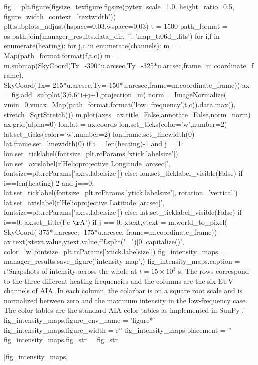 \begin{pycode}
fig = plt.figure(figsize=texfigure.figsize(pytex, scale=1.0, height_ratio=0.5, 
                                           figure_width_context='textwidth'))
plt.subplots_adjust(hspace=0.03,wspace=0.03)
t = 1500
path_format = os.path.join(manager_results.data_dir, '{}', 'map_t{:06d}_{}.fits')
for i,f in enumerate(heating):
    for j,c in enumerate(channels):
        m = Map(path_format.format(f,t,c))
        m = m.submap(SkyCoord(Tx=-390*u.arcsec,Ty=-325*u.arcsec,frame=m.coordinate_frame),
                     SkyCoord(Tx=-215*u.arcsec,Ty=-150*u.arcsec,frame=m.coordinate_frame))
        ax = fig.add_subplot(3,6,6*i+j+1,projection=m)
        norm = ImageNormalize(
            vmin=0,vmax=Map(path_format.format('low_frequency',t,c)).data.max(),
            stretch=SqrtStretch())
        m.plot(axes=ax,title=False,annotate=False,norm=norm)
        ax.grid(alpha=0)
        lon,lat = ax.coords
        lon.set_ticks(color='w',number=2)
        lat.set_ticks(color='w',number=2)
        lon.frame.set_linewidth(0)
        lat.frame.set_linewidth(0)
        if i==len(heating)-1 and j==1:
            lon.set_ticklabel(fontsize=plt.rcParams['xtick.labelsize'])
            lon.set_axislabel(r'Helioprojective Longitude [arcsec]',
                                fontsize=plt.rcParams['axes.labelsize'])
        else:
            lon.set_ticklabel_visible(False)
        if i==len(heating)-2 and j==0:
            lat.set_ticklabel(fontsize=plt.rcParams['ytick.labelsize'], rotation='vertical')
            lat.set_axislabel(r'Helioprojective Latitude [arcsec]',
                                fontsize=plt.rcParams['axes.labelsize'])
        else:
            lat.set_ticklabel_visible(False)
        if i==0:
            ax.set_title(f'{c} $\mathrm{{\AA}}$')
        if j == 0:
            xtext,ytext = m.world_to_pixel(
                SkyCoord(-375*u.arcsec, -175*u.arcsec, frame=m.coordinate_frame))
            ax.text(xtext.value,ytext.value,f'{f.split("_")[0].capitalize()}',
                    color='w',fontsize=plt.rcParams['xtick.labelsize'])
fig_intensity_maps = manager_results.save_figure('intensity-map',)
fig_intensity_maps.caption = r'Snapshots of intensity across the whole \AR{} at $t=15\times10^3$ s. The rows correspond to the three different heating frequencies and the columns are the six EUV channels of AIA. In each column, the colarbar is on a square root scale and is normalized between zero and the maximum intensity in the low-frequency case. The color tables are the standard AIA color tables as implemented in SunPy \citep{sunpy_community_sunpypython_2015}.'
fig_intensity_maps.figure_env_name = 'figure*'
fig_intensity_maps.figure_width = r'\textwidth'
fig_intensity_maps.placement = ''
fig_intensity_maps.fig_str = fig_str
\end{pycode}
|fig_intensity_maps|


